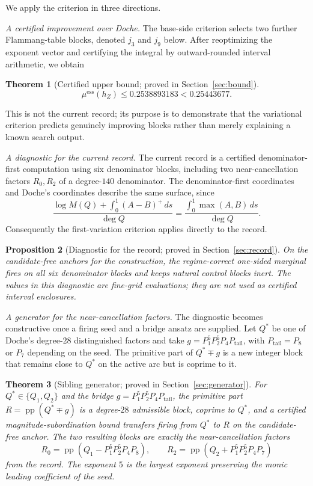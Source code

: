 \documentclass[11pt,reqno]{amsart}
\theoremstyle{plain}
\newtheorem{theorem}{Theorem}
\newtheorem{proposition}[theorem]{Proposition}
\theoremstyle{definition}
\theoremstyle{remark}
\newcommand{\hZ}{h_Z}
\newcommand{\essmin}{\mu^{\mathrm{ess}}(\hZ)}
\DeclareMathOperator{\pp}{pp}
\begin{document}
We apply the criterion in three directions.

\emph{A certified improvement over Doche.}  The base-side criterion selects two further
Flammang-table blocks, denoted $j_3$ and $j_9$ below.  After reoptimizing the exponent
vector and certifying the integral by outward-rounded interval arithmetic, we obtain
\begin{theorem}[Certified upper bound; proved in Section~\ref{sec:bound}]
\label{thm:upper}
\[
  \essmin\le 0.2538893183 <0.25443677.
\]
\end{theorem}
This is not the current record; its purpose is to demonstrate that the variational
criterion predicts genuinely improving blocks rather than merely explaining a known
search output.

\emph{A diagnostic for the current record.}  The current record \citep{Gri26} is a
certified denominator-first computation using six denominator blocks, including two
near-cancellation factors $R_0,R_2$ of a degree-$140$ denominator.  The denominator-first
coordinates and Doche's coordinates describe the same surface, since
\[
  \frac{\log M(Q)+\int_0^1(A-B)^+\,ds}{\deg Q}
  =\frac{\int_0^1\max(A,B)\,ds}{\deg Q}.
\]
Consequently the first-variation criterion applies directly to the record.

\begin{proposition}[Diagnostic for the record; proved in Section~\ref{sec:record}]
\label{prop:record-intro}
On the candidate-free anchors for the \citet{Gri26} construction, the regime-correct
one-sided marginal fires on all six denominator blocks and keeps natural control blocks
inert.  The values in this diagnostic are fine-grid evaluations; they are not used as
certified interval enclosures.
\end{proposition}

\emph{A generator for the near-cancellation factors.}  The diagnostic becomes
constructive once a firing seed and a bridge ansatz are supplied.  Let $Q^*$ be one of
Doche's degree-$28$ distinguished factors and take
$g=P_1^5P_2^5P_4P_{\mathrm{tail}}$, with $P_{\mathrm{tail}}=P_8$ or $P_7$ depending on
the seed.  The primitive part of $Q^*\mp g$ is a new integer block that remains close
to $Q^*$ on the active arc but is coprime to it.

\begin{theorem}[Sibling generator; proved in Section~\ref{sec:generator}]
\label{thm:gen-intro}
For $Q^*\in\{Q_1,Q_2\}$ and the bridge $g=P_1^5P_2^5P_4P_{\mathrm{tail}}$, the
primitive part $R=\pp(Q^*\mp g)$ is a degree-$28$ admissible block, coprime to $Q^*$,
and a certified magnitude-subordination bound transfers firing from $Q^*$ to $R$ on
the candidate-free anchor.  The two resulting blocks are exactly the
near-cancellation factors
\[
  R_0=\pp(Q_1-P_1^5P_2^5P_4P_8),\qquad
  R_2=\pp(Q_2+P_1^5P_2^5P_4P_7)
\]
from the \citet{Gri26} record.  The exponent $5$ is the largest exponent preserving
the monic leading coefficient of the seed.
\end{theorem}
\end{document}
